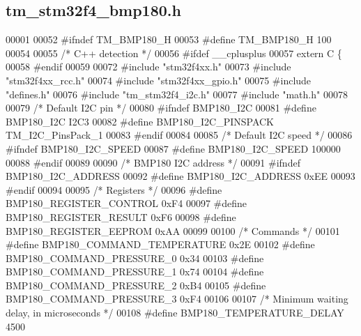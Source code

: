 \hypertarget{tm__stm32f4__bmp180_8h_source}{}\subsection{tm\+\_\+stm32f4\+\_\+bmp180.\+h}

\begin{DoxyCode}
00001 
00052 \textcolor{preprocessor}{#ifndef TM\_BMP180\_H}
00053 \textcolor{preprocessor}{#define TM\_BMP180\_H 100}
00054 
00055 \textcolor{comment}{/* C++ detection */}
00056 \textcolor{preprocessor}{#ifdef \_\_cplusplus}
00057 \textcolor{keyword}{extern} C \{
00058 \textcolor{preprocessor}{#endif}
00059 
00072 \textcolor{preprocessor}{#include "stm32f4xx.h"}
00073 \textcolor{preprocessor}{#include "stm32f4xx\_rcc.h"}
00074 \textcolor{preprocessor}{#include "stm32f4xx\_gpio.h"}
00075 \textcolor{preprocessor}{#include "defines.h"}
00076 \textcolor{preprocessor}{#include "tm\_stm32f4\_i2c.h"}
00077 \textcolor{preprocessor}{#include "math.h"}
00078 
00079 \textcolor{comment}{/* Default I2C pin */}
00080 \textcolor{preprocessor}{#ifndef BMP180\_I2C}
00081 \textcolor{preprocessor}{#define BMP180\_I2C                  I2C3}
00082 \textcolor{preprocessor}{#define BMP180\_I2C\_PINSPACK         TM\_I2C\_PinsPack\_1}
00083 \textcolor{preprocessor}{#endif}
00084 
00085 \textcolor{comment}{/* Default I2C speed */}
00086 \textcolor{preprocessor}{#ifndef BMP180\_I2C\_SPEED}
00087 \textcolor{preprocessor}{#define BMP180\_I2C\_SPEED            100000}
00088 \textcolor{preprocessor}{#endif}
00089 
00090 \textcolor{comment}{/* BMP180 I2C address */}
00091 \textcolor{preprocessor}{#ifndef BMP180\_I2C\_ADDRESS}
00092 \textcolor{preprocessor}{#define BMP180\_I2C\_ADDRESS          0xEE}
00093 \textcolor{preprocessor}{#endif}
00094 
00095 \textcolor{comment}{/* Registers */}
00096 \textcolor{preprocessor}{#define BMP180\_REGISTER\_CONTROL     0xF4}
00097 \textcolor{preprocessor}{#define BMP180\_REGISTER\_RESULT      0xF6}
00098 \textcolor{preprocessor}{#define BMP180\_REGISTER\_EEPROM      0xAA}
00099 
00100 \textcolor{comment}{/* Commands */}
00101 \textcolor{preprocessor}{#define BMP180\_COMMAND\_TEMPERATURE  0x2E}
00102 \textcolor{preprocessor}{#define BMP180\_COMMAND\_PRESSURE\_0   0x34}
00103 \textcolor{preprocessor}{#define BMP180\_COMMAND\_PRESSURE\_1   0x74}
00104 \textcolor{preprocessor}{#define BMP180\_COMMAND\_PRESSURE\_2   0xB4}
00105 \textcolor{preprocessor}{#define BMP180\_COMMAND\_PRESSURE\_3   0xF4}
00106 
00107 \textcolor{comment}{/* Minimum waiting delay, in microseconds */}
00108 \textcolor{preprocessor}{#define BMP180\_TEMPERATURE\_DELAY    4500}

\end{DoxyCode}
